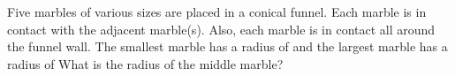 Five marbles of various sizes are placed in a conical funnel. Each marble is in contact with the adjacent marble(s). Also, each marble is in contact all around the funnel wall. The smallest marble has a radius of  and the largest marble has a radius of  What is the radius of the middle marble?